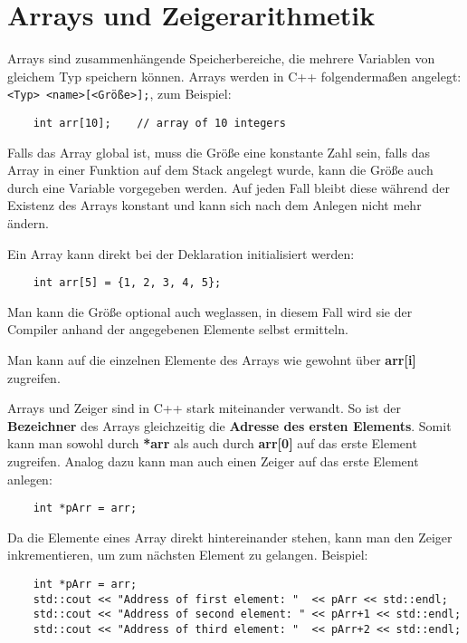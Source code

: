 \section{Arrays und Zeigerarithmetik}
Arrays sind zusammenhängende Speicherbereiche, die mehrere Variablen von gleichem Typ speichern können.
Arrays werden in C++ folgendermaßen angelegt: \texttt{<Typ> <name>[<Größe>];}, zum Beispiel:

\begin{lstlisting}
	int arr[10];	// array of 10 integers
\end{lstlisting}

Falls das Array global ist, muss die Größe eine konstante Zahl sein, falls das Array in einer Funktion auf dem Stack angelegt wurde, kann die Größe auch durch eine Variable vorgegeben werden.
Auf jeden Fall bleibt diese während der Existenz des Arrays konstant und kann sich nach dem Anlegen nicht mehr ändern.

Ein Array kann direkt bei der Deklaration initialisiert werden:

\begin{lstlisting}
	int arr[5] = {1, 2, 3, 4, 5};
\end{lstlisting}

Man kann die Größe optional auch weglassen, in diesem Fall wird sie der Compiler anhand der angegebenen Elemente selbst ermitteln.

Man kann auf die einzelnen Elemente des Arrays wie gewohnt über \textbf{arr[i]} zugreifen.

Arrays und Zeiger sind in C++ stark miteinander verwandt.
So ist der \textbf{Bezeichner} des Arrays gleichzeitig die \textbf{Adresse des ersten Elements}.
Somit kann man sowohl durch \textbf{*arr} als auch durch \textbf{arr[0]} auf das erste Element zugreifen.
Analog dazu kann man auch einen Zeiger auf das erste Element anlegen:

\begin{lstlisting}
	int *pArr = arr;
\end{lstlisting}

Da die Elemente eines Array direkt hintereinander stehen, kann man den Zeiger inkrementieren, um zum  nächsten Element zu gelangen.
Beispiel:

\begin{lstlisting}
	int *pArr = arr;
	std::cout << "Address of first element: "  << pArr << std::endl;
	std::cout << "Address of second element: " << pArr+1 << std::endl;
	std::cout << "Address of third element: "  << pArr+2 << std::endl;
\end{lstlisting}

